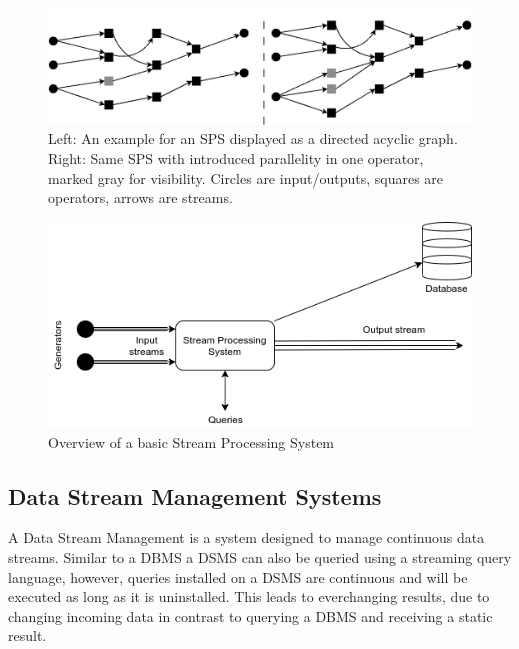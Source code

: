         \begin{figure}[h]
        \label{fig:sps_parallel_normal}
        \centering
        \includegraphics[width=1.0\textwidth]{Bilder/sps_parallel_normal.png}
        \caption{
                Left: An example for an SPS displayed as a directed acyclic graph. 
                Right: Same SPS with introduced parallelity in one operator, marked gray for visibility. 
                Circles are input/outputs, squares are operators, arrows are streams.
                }
        \end{figure}

        \begin{figure}
        \label{fig:stream-processing-system}
        \centering
        \includegraphics[width=1.0\textwidth]{Bilder/stream-processing-system.png}
        \caption{
                Overview of a basic Stream Processing System
                }
        \end{figure}


        \subsection{Data Stream Management Systems}
        \label{sub:dsms}
        A Data Stream Management is a system designed to manage continuous data streams.
        Similar to a DBMS a DSMS can also be queried using a streaming query language, however, queries installed on a DSMS are continuous 
        and will be executed as long as it is uninstalled.
        This leads to everchanging results, due to changing incoming data in contrast to querying a DBMS and receiving a static result.
        

